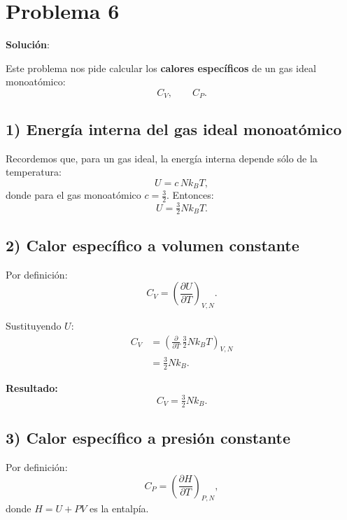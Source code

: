 \documentclass{article}
\begin{document}
\section*{Problema 6}

\textcolor{Cinnabar}{\textbf{Solución}}:

Este problema nos pide calcular los \textcolor{orange(colorwheel)}{\textbf{calores específicos}} de un gas ideal monoatómico:  
\[
C_{V}, \qquad C_{P}.
\]



\subsection*{1) Energía interna del gas ideal monoatómico}

Recordemos que, para un gas ideal, la energía interna depende sólo de la temperatura:
\[
U = c\,N k_{B} T,
\]
donde para el gas monoatómico \(c=\tfrac{3}{2}\). Entonces:
\[
U = \tfrac{3}{2} N k_{B} T.
\]



\subsection*{2) Calor específico a volumen constante}

Por definición:
\[
C_{V} = \left(\frac{\partial U}{\partial T}\right)_{V,N}.
\]

Sustituyendo \(U\):
\begin{equation*}
\begin{split}
C_{V}
&= \left(\frac{\partial}{\partial T}\,\tfrac{3}{2}N k_{B} T\right)_{V,N} \\[6pt]
&= \tfrac{3}{2} N k_{B}.
\end{split}
\end{equation*}

\textcolor{Apple Green}{\textbf{Resultado:}}
\[
C_{V} = \tfrac{3}{2} N k_{B}.
\]



\subsection*{3) Calor específico a presión constante}

Por definición:
\[
C_{P} = \left(\frac{\partial H}{\partial T}\right)_{P,N},
\]
donde \(H = U + PV\) es la entalpía.
\end{document}
